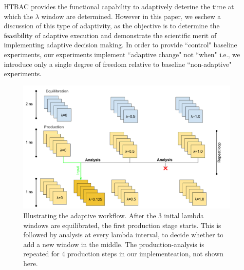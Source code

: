 

HTBAC provides the functional capability to adaptively deterine the time at
which the $\lambda$ window are determined. 
However in this paper, we eschew a
discussion of this type of adaptivity, as the objective is to determine the
feasibility of adaptive execution and demonstrate the scientific merit of
implementing adaptive decision making. In order to provide ``control" baseline
experiments, our experiments implement ``adaptive change" not ``when" i.e., we
introduce only a single degree of freedom relative to baseline ``non-adaptive"
experiments.

\begin{figure}
  \centering
   \includegraphics[width=\columnwidth]{figures/Adaptive_TIES_1.png}
  \caption{Illustrating the adaptive workflow. After the 3 inital lambda windows are equilibrated, the first production stage starts. This is followed by analysis at every lambda interval, to decide whether to add a new window in the middle. The production-analysis is repeated for 4 production steps in our implementeation, not shown here.}
\label{fig:adaptive_TIES}
\end{figure}



